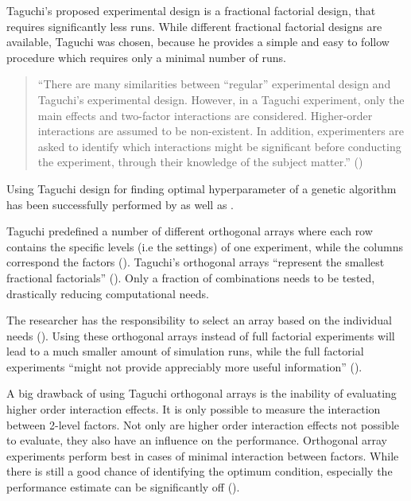 Taguchi's proposed experimental design is a fractional factorial design, that requires significantly less runs. While different fractional factorial designs are available, Taguchi was chosen, because he provides a simple and easy to follow procedure which requires only a minimal number of runs.

\begin{quote}
	\begin{em}
		\enquote{There are many similarities between “regular” experimental design and Taguchi's experimental design. However, in a Taguchi experiment, only the main effects and two-factor interactions are considered. Higher-order interactions are assumed to be non-existent. In addition, experimenters are asked to identify which interactions might be significant before conducting the experiment, through their knowledge of the subject matter.} (\cite{yang_design_2009})
	\end{em}
\end{quote}

Using Taguchi design for finding optimal hyperparameter of a genetic algorithm has been successfully performed by \cite{dao_maximising_2016} as well as \cite{naruka_parameter_2019}.

Taguchi predefined a number of different orthogonal arrays where each row contains the specific levels (i.e the settings) of one experiment, while the columns correspond the factors (\cite{li_taguchi_2021}). Taguchi's orthogonal arrays \enquote{represent the smallest fractional factorials} (\cite{roy_primer_1990}). Only a fraction of combinations needs to be tested, drastically reducing computational needs.

The researcher has the responsibility to select an array based on the individual needs (\cite{li_taguchi_2021}).
Using these orthogonal arrays instead of full factorial experiments will lead to a much smaller amount of simulation runs, while the full factorial experiments \enquote{might not provide appreciably more useful information} (\cite{roy_primer_1990}).

A big drawback of using Taguchi orthogonal arrays is the inability of evaluating higher order interaction effects. It is only possible to measure the interaction between 2-level factors. Not only are higher order interaction effects not possible to evaluate, they also have an influence on the performance. Orthogonal array experiments perform best in cases of minimal interaction between factors. While there is still a good chance of identifying the optimum condition, especially the performance estimate can be significantly off (\cite{roy_primer_1990}).

